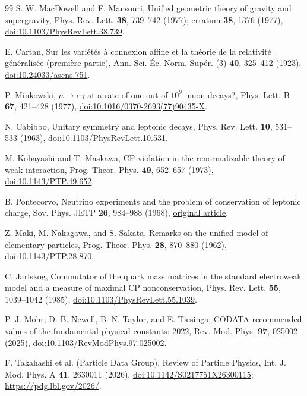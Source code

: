 \documentclass[aps,prx,reprint,longbibliography]{revtex4-2}
\begin{document}
\begin{thebibliography}{99}
S. W. MacDowell and F. Mansouri, Unified geometric theory of gravity and supergravity,
Phys. Rev. Lett. \textbf{38}, 739--742 (1977);
erratum \textbf{38}, 1376 (1977),
\href{https://doi.org/10.1103/PhysRevLett.38.739}{doi:10.1103/PhysRevLett.38.739}.

E. Cartan, Sur les vari\'et\'es \`a connexion affine et la th\'eorie de la relativit\'e g\'en\'eralis\'ee (premi\`ere partie),
Ann. Sci. \'Ec. Norm. Sup\'er. (3) \textbf{40}, 325--412 (1923),
\href{https://doi.org/10.24033/asens.751}{doi:10.24033/asens.751}.

P. Minkowski, $\mu\to e\gamma$ at a rate of one out of $10^9$ muon decays?,
Phys. Lett. B \textbf{67}, 421--428 (1977),
\href{https://doi.org/10.1016/0370-2693(77)90435-X}{doi:10.1016/0370-2693(77)90435-X}.

N. Cabibbo, Unitary symmetry and leptonic decays,
Phys. Rev. Lett. \textbf{10}, 531--533 (1963),
\href{https://doi.org/10.1103/PhysRevLett.10.531}{doi:10.1103/PhysRevLett.10.531}.

M. Kobayashi and T. Maskawa, CP-violation in the renormalizable theory of weak interaction,
Prog. Theor. Phys. \textbf{49}, 652--657 (1973),
\href{https://doi.org/10.1143/PTP.49.652}{doi:10.1143/PTP.49.652}.

B. Pontecorvo, Neutrino experiments and the problem of conservation of leptonic charge,
Sov. Phys. JETP \textbf{26}, 984--988 (1968),
\href{https://jetp.ras.ru/cgi-bin/dn/e_026_05_0984.pdf}{original article}.

Z. Maki, M. Nakagawa, and S. Sakata, Remarks on the unified model of elementary particles,
Prog. Theor. Phys. \textbf{28}, 870--880 (1962),
\href{https://doi.org/10.1143/PTP.28.870}{doi:10.1143/PTP.28.870}.

C. Jarlskog, Commutator of the quark mass matrices in the standard electroweak model and a measure of maximal CP nonconservation,
Phys. Rev. Lett. \textbf{55}, 1039--1042 (1985),
\href{https://doi.org/10.1103/PhysRevLett.55.1039}{doi:10.1103/PhysRevLett.55.1039}.

P. J. Mohr, D. B. Newell, B. N. Taylor, and E. Tiesinga,
CODATA recommended values of the fundamental physical constants: 2022,
Rev. Mod. Phys. \textbf{97}, 025002 (2025),
\href{https://doi.org/10.1103/RevModPhys.97.025002}{doi:10.1103/RevModPhys.97.025002}.

F. Takahashi et al. (Particle Data Group), Review of Particle Physics,
Int. J. Mod. Phys. A \textbf{41}, 2630011 (2026),
\href{https://doi.org/10.1142/S0217751X26300115}{doi:10.1142/S0217751X26300115};
\url{https://pdg.lbl.gov/2026/}.


\end{thebibliography}
\end{document}
